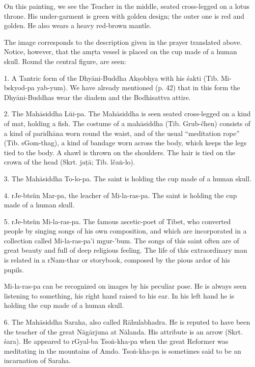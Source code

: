 \documentclass[a4paper, 12pt, oneside]{article}
\begin{document}
\bigskip

On this painting, we see the Teacher in the middle, seated cross-legged on a lotus throne. His under-garment is green with golden design; the outer one is red and golden. He also wears a heavy red-brown mantle.

The image corresponds to the description given in the prayer translated above. Notice, however, that the am\d{r}ta vessel is placed on the cup made of a human skull. Round the central figure, are seen:

1. A Tantric form of the Dhy\={a}ni-Buddha Ak\d{s}obhya with his \'{s}akti (Tib. Mi-bskyod-pa yab-yum). We have already mentioned (p. 42) that in this form the Dhy\={a}ni-Buddhas wear the diadem and the Bodhisattva attire.

2. The Mah\={a}siddha L\={u}i-pa. The Mah\={a}siddha is seen seated cross-legged on a kind of mat, holding a fish. The costume of a mah\={a}siddha (Tib. Grub-čhen) consists of a kind of paridh\={a}na worn round the waist, and of the usual ``meditation rope'' (Tib. sGom-thag), a kind of bandage worn across the body, which keeps the legs tied to the body. A shawl is thrown on the shoulders. The hair is tied on the crown of the head (Skrt. ja\d{t}\={a}; Tib. lča\.{n}-lo).

3. The Mah\={a}siddha To-lo-pa. The saint is holding the cup made of a human skull.

4. rJe-btsün Mar-pa, the leacher of Mi-la-ras-pa. The saint is holding the cup made of a human skull.

5. rJe-btsün Mi-la-ras-pa. The famous ascetic-poet of Tibet, who converted people by singing songs of his own composition, and which are incorporated in a collection called Mi-la-ras-pa'i mgur-'bum. The songs of this saint often are of great beauty and full of deep religious feeling. The life of this extraordinary man is related in a rNam-thar or storybook, composed by the pious ardor of his pupils.

Mi-la-ras-pa can be recognized on images by his peculiar pose. He is always seen listening to something, his right hand raised to his ear. In his left hand he is holding the cup made of a human skull.

6. The Mah\={a}siddha Saraha, also called R\={a}hulabhadra. He is reputed to have been the teacher of the great N\={a}g\={a}rjuna at N\={a}landa. His attribute is an arrow (Skrt. \'{s}ara). He appeared to rGyal-ba Tso\.{n}-kha-pa when the great Reformer was meditating in the mountains of Amdo. Tso\.{n}-kha-pa is sometimes said to be an incarnation of Saraha.
\end{document}
